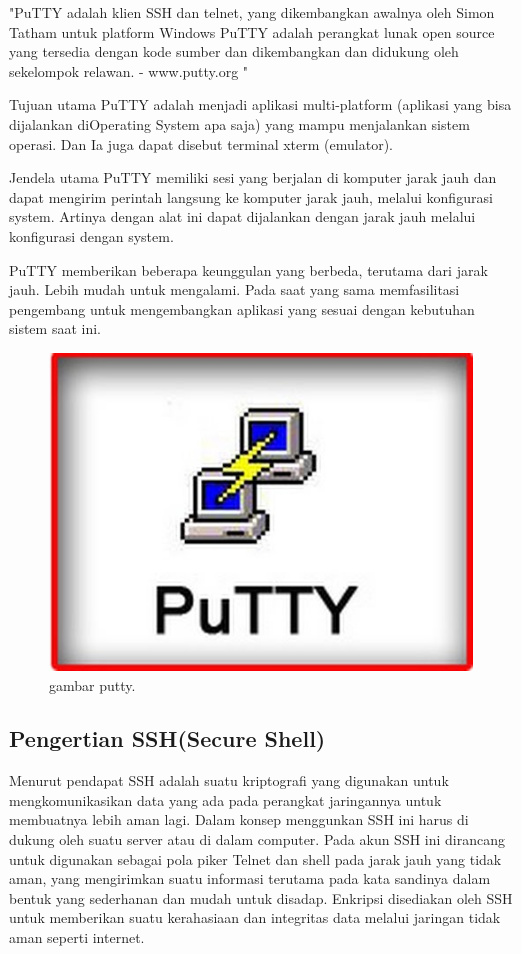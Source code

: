 "PuTTY adalah klien SSH dan telnet, yang dikembangkan awalnya oleh Simon Tatham untuk platform Windows PuTTY adalah perangkat lunak open source yang tersedia dengan kode sumber dan dikembangkan dan didukung oleh sekelompok relawan.
- www.putty.org "

Tujuan utama PuTTY adalah menjadi aplikasi multi-platform (aplikasi yang bisa dijalankan diOperating System apa saja) yang mampu menjalankan sistem operasi. Dan Ia juga dapat disebut terminal xterm (emulator).

Jendela utama PuTTY memiliki sesi yang berjalan di komputer jarak jauh dan dapat mengirim perintah langsung ke komputer jarak jauh, melalui konfigurasi system. Artinya dengan alat ini dapat dijalankan dengan jarak jauh melalui konfigurasi dengan system.

PuTTY memberikan beberapa keunggulan yang berbeda, terutama dari jarak jauh. Lebih mudah untuk mengalami. Pada saat yang sama memfasilitasi pengembang untuk mengembangkan aplikasi yang sesuai dengan kebutuhan sistem saat ini. 

\begin{figure}[ht]
\centerline{\includegraphics[width=1\textwidth]{figures/puttyexe.jpg}}
\caption{gambar putty.}
\label{putty}
\end{figure}


\subsection {Pengertian SSH(Secure Shell)}

Menurut pendapat \cite{Jusuf.Heni2015Penggunaan Secure Shell} SSH adalah suatu kriptografi yang digunakan untuk mengkomunikasikan data yang ada pada perangkat jaringannya untuk membuatnya lebih aman lagi. Dalam konsep menggunkan SSH ini harus di dukung oleh suatu server atau di dalam computer. Pada akun SSH ini dirancang untuk digunakan sebagai pola piker Telnet dan shell pada jarak jauh yang tidak aman, yang mengirimkan suatu informasi terutama pada kata sandinya dalam bentuk yang sederhanan dan mudah untuk disadap. Enkripsi disediakan oleh SSH untuk memberikan suatu kerahasiaan dan integritas data melalui jaringan tidak aman seperti internet.

